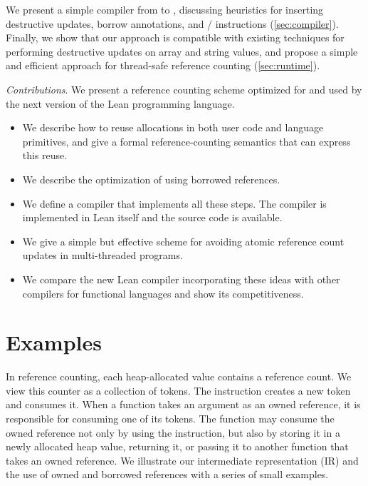 We present a simple compiler from \pureIR{} to \rcIR{},
discussing heuristics for inserting destructive updates, borrow
annotations, and / instructions (\cref{sec:compiler}).
Finally, we show that our approach is compatible with existing techniques
for performing destructive updates on array and string values, and
propose a simple and efficient approach for thread-safe reference
counting (\cref{sec:runtime}).

\emph{Contributions}. We present a reference counting scheme optimized for and
used by the next version of the Lean programming language.
\begin{itemize}
\item We describe how to reuse allocations in both user code and
  language primitives, and give a formal reference-counting semantics that
  can express this reuse.
\item We describe the optimization of using borrowed references.
\item We define a compiler that implements all these steps. The compiler is implemented
  in Lean itself and the source code is available.
\item We give a simple but effective scheme for avoiding atomic reference count
  updates in multi-threaded programs.
\item We compare the new Lean compiler incorporating these ideas with other
  compilers for functional languages and show its competitiveness.
\end{itemize}

\section{Examples}
\label{sec:examples}

In reference counting, each heap-allocated value contains a reference
count. We view this counter as a collection of tokens. The 
instruction creates a new token and  consumes it. When a function
takes an argument as an owned reference, it is responsible for
consuming one of its tokens. The function may consume the owned
reference not only by using the  instruction, but also by storing
it in a newly allocated heap value, returning it, or passing it to
another function that takes an owned reference. We illustrate our intermediate
representation (IR) and the use of owned and borrowed references with a series of
small examples.

